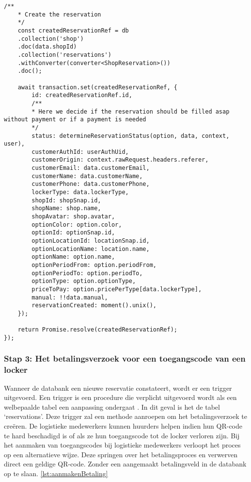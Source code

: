 \begin{lstlisting}[caption={De creatie van een reservatie voor het huren van een locker. Deze reservatie wordt bijgehouden in de databank}, label={lst:aanmakenReservatie}]
    /**
    * Create the reservation
    */
    const createdReservationRef = db
    .collection('shop')
    .doc(data.shopId)
    .collection('reservations')
    .withConverter(converter<ShopReservation>())
    .doc();
    
    await transaction.set(createdReservationRef, {
        id: createdReservationRef.id,
        /**
        * Here we decide if the reservation should be filled asap without payment or if a payment is needed
        */
        status: determineReservationStatus(option, data, context, user),
        customerAuthId: userAuthUid,
        customerOrigin: context.rawRequest.headers.referer,
        customerEmail: data.customerEmail,
        customerName: data.customerName,
        customerPhone: data.customerPhone,
        lockerType: data.lockerType,
        shopId: shopSnap.id,
        shopName: shop.name,
        shopAvatar: shop.avatar,
        optionColor: option.color,
        optionId: optionSnap.id,
        optionLocationId: locationSnap.id,
        optionLocationName: location.name,
        optionName: option.name,
        optionPeriodFrom: option.periodFrom,
        optionPeriodTo: option.periodTo,
        optionType: option.optionType,
        priceToPay: option.pricePerType[data.lockerType],
        manual: !!data.manual,
        reservationCreated: moment().unix(),
    });
    
    return Promise.resolve(createdReservationRef);
});
\end{lstlisting}

\subsubsection{Stap 3: Het betalingsverzoek voor een toegangscode van een locker}%
\label{sec:opbouwQR-codeVerkoop12}

Wanneer de databank een nieuwe reservatie constateert, wordt er een trigger uitgevoerd. Een trigger is een procedure die verplicht uitgevoerd wordt als een welbepaalde tabel een aanpassing ondergaat \autocite{documentation}. In dit geval is het de tabel ‘reservations’. Deze trigger zal een methode aanroepen om het betalingsverzoek te creëren.
De logistieke medewerkers kunnen huurders helpen indien hun QR-code te hard beschadigd is of als ze hun toegangscode tot de locker verloren zijn. Bij het aanmaken van toegangscodes bij logistieke medewerkers verloopt het proces op een alternatieve wijze.  Deze springen over het betalingsproces en verwerven direct een geldige QR-code. Zonder een aangemaakt betalingsveld in de databank op te slaan.  \ref{lst:aanmakenBetaling}

